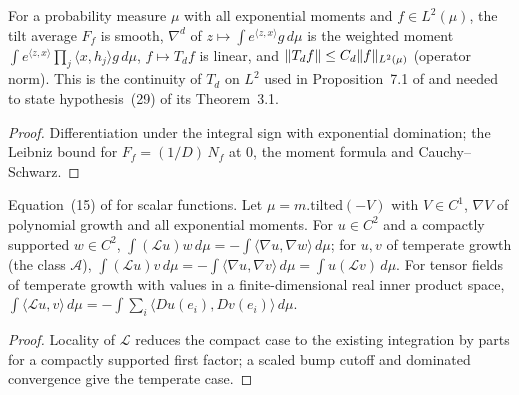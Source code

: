 \begin{lemma}
  \label{lem:bkl-taylor-l2}
  \leanok
  For a probability measure $\mu$ with all exponential moments and $f\in L^2(\mu)$, the tilt average
  $F_f$ is smooth, $\nabla^d$ of $z\mapsto\int e^{\langle z,x\rangle}g\,d\mu$ is the weighted moment
  $\int e^{\langle z,x\rangle}\prod_j\langle x,h_j\rangle g\,d\mu$, $f\mapsto T_df$ is linear, and
  $\lVert T_df\rVert\le C_d\lVert f\rVert_{L^2(\mu)}$ (operator norm).  This is the continuity of $T_d$ on $L^2$
  used in Proposition~7.1 of \cite{BizeulKlartagLehec2026} and needed to state hypothesis~(29) of its
  Theorem~3.1.
\end{lemma}
\begin{proof}
  \leanok
  Differentiation under the integral sign with exponential domination; the Leibniz bound for
  $F_f=(1/D)\,N_f$ at $0$, the moment formula and Cauchy--Schwarz.
\end{proof}

\begin{lemma}
  \label{lem:bkl-ibp-temperate}
  \leanok
  Equation~(15) of \cite{BizeulKlartagLehec2026} for scalar functions.  Let $\mu=m.\mathrm{tilted}(-V)$
  with $V\in C^1$, $\nabla V$ of polynomial growth and all exponential moments.  For $u\in C^2$ and
  a compactly supported $w\in C^2$, $\int(\mathcal Lu)w\,d\mu=-\int\langle\nabla u,\nabla w\rangle\,d\mu$;
  for $u,v$ of temperate growth (the class $\mathcal A$),
  $\int(\mathcal Lu)v\,d\mu=-\int\langle\nabla u,\nabla v\rangle\,d\mu=\int u(\mathcal Lv)\,d\mu$.  For
  tensor fields of temperate growth with values in a finite-dimensional real inner product space,
  $\int\langle\mathcal Lu,v\rangle\,d\mu=-\int\sum_i\langle Du(e_i),Dv(e_i)\rangle\,d\mu$.
\end{lemma}
\begin{proof}
  \leanok
  Locality of $\mathcal L$ reduces the compact case to the existing integration by parts for a
  compactly supported first factor; a scaled bump cutoff and dominated convergence give the
  temperate case.
\end{proof}

